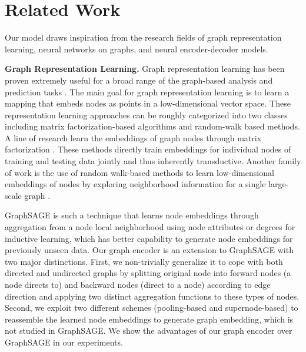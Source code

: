 \documentclass{article} \usepackage{iclr2019_conference,times}
\begin{document}
\section{Related Work}
Our model draws inspiration from the research fields of graph representation learning, neural networks on graphs, and neural encoder-decoder models. 

\textbf{Graph Representation Learning.} Graph representation learning has been proven extremely useful for a broad range of the graph-based analysis and prediction tasks \citep{hamilton2017representation,goyal2017graph}. The main goal for graph representation learning is to learn a mapping that embeds nodes as points in a low-dimensional vector space. These representation learning approaches can be roughly categorized into two classes including matrix factorization-based algorithms and random-walk based methods. A line of research learn the embeddings of graph nodes through matrix factorization \citep{roweis2000nonlinear,belkin2002laplacian,ahmed2013distributed,cao2015grarep,ou2016asymmetric}. These methods directly train embeddings for individual nodes of training and testing data jointly and thus inherently transductive. Another family of work is the use of random walk-based methods to learn low-dimensional embeddings of nodes by exploring neighborhood information for a single large-scale graph \citep{duran2017leanring, hamilton2017inductive, tang2015line, grover2016node2vec, perozzi2014deepwalk,velickovic2017graph}. 

GraphSAGE \citep{hamilton2017inductive} is such a technique that learns node embeddings through aggregation from a node local neighborhood using node attributes or degrees for inductive learning, which has better capability to generate node embeddings for previously unseen data. Our graph encoder is an extension to GraphSAGE with two major distinctions. First, we non-trivially generalize it to cope with both directed and undirected graphs by splitting original node into forward nodes (a node directs to) and backward nodes (direct to a node) according to edge direction and applying two distinct aggregation functions to these types of nodes. Second, we exploit two different schemes (pooling-based and supernode-based) to reassemble the learned node embeddings to generate graph embedding, which is not studied in GraphSAGE. We show the advantages of our graph encoder over GraphSAGE in our experiments. 
\end{document}
